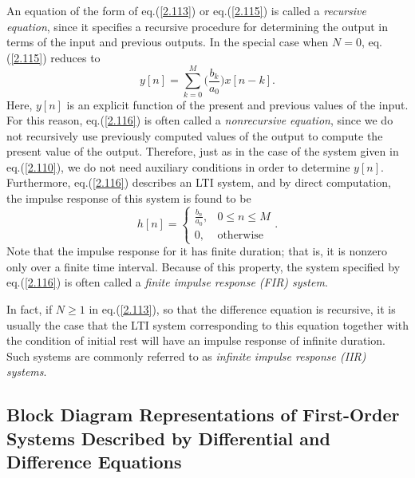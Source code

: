 \documentclass[a4paper,10pt,twoside]{book}
\begin{document}
An equation of the form of eq.\;(\ref{2.113}) or eq.\;(\ref{2.115}) is called a \textit{recursive equation}, since it specifies a recursive procedure for determining the output in terms of the input and previous outputs. In the special case when $N=0$, eq.\;(\ref{2.115}) reduces to
\begin{equation}
    y[n] = \sum_{k=0}^M\biggl(\frac{b_k}{a_0}\biggr)x[n-k].
    \label{2.116}
\end{equation}
Here, $y[n]$ is an explicit function of the present and previous values of the input. For this reason, eq.\;(\ref{2.116}) is often called a \textit{nonrecursive equation}, since we do not recursively use previously computed values of the output to compute the present value of the output. Therefore, just as in the case of the system given in eq.\;(\ref{2.110}), we do not need auxiliary conditions in order to determine $y[n]$. Furthermore, eq.\;(\ref{2.116}) describes an LTI system, and by direct computation, the impulse response of this system is found to be
\begin{equation}
    \left.h[n]=\left\{\begin{array}{ll}\frac{b_n}{a_0},&0\leq n\leq M\\0,&\text{otherwise}\end{array}\right.\right..
    \label{2.117}
\end{equation}
Note that the impulse response for it has finite duration; that is, it is nonzero only over a finite time interval. Because of this property, the system specified by eq.\;(\ref{2.116}) is often called a \textit{finite impulse response (FIR) system}.

In fact, if $N\ge 1$ in eq.\;(\ref{2.113}), so that the difference equation is recursive, it is usually the case that the LTI system corresponding to this equation together with the condition of initial rest will have an impulse response of infinite duration. Such systems are commonly referred to as \textit{infinite impulse response (IIR) systems}.

\subsection{Block Diagram Representations of First-Order Systems Described by Differential and Difference Equations}
\end{document}
